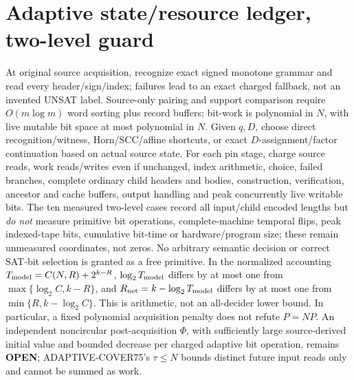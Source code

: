 \documentclass[10pt]{article}
\begin{document}
\section{Adaptive state/resource ledger, two-level guard}
At original source acquisition, recognize exact signed monotone grammar and read every header/sign/index; failures lead to an exact charged fallback, not an invented UNSAT label. Source-only pairing and support comparison require \(O(m\log m)\) word sorting plus record buffers; bit-work is polynomial in \(N\), with live mutable bit space at most polynomial in \(N\). Given \(q,D\), choose direct recognition/witness, Horn/SCC/affine shortcuts, or exact \(D\)-assignment/factor continuation based on actual source state. For each pin stage, charge source reads, work reads/writes even if unchanged, index arithmetic, choice, failed branches, complete ordinary child headers and bodies, construction, verification, ancestor and cache buffers, output handling and peak concurrently live writable bits. The ten measured two-level cases record all input/child encoded lengths but \emph{do not} measure primitive bit operations, complete-machine temporal flips, peak indexed-tape bits, cumulative bit-time or hardware/program size; these remain unmeasured coordinates, not zeros. No arbitrary semantic decision or correct SAT-bit selection is granted as a free primitive.
In the normalized accounting \(T_{\rm model}=C(N,R)+2^{k-R}\), \(\log_2T_{\rm model}\) differs by at most one from \(\max\{\log_2 C,k-R\}\), and \(R_{\rm net}=k-\log_2T_{\rm model}\) differs by at most one from \(\min\{R,k-\log_2C\}\). This is arithmetic, not an all-decider lower bound. In particular, a fixed polynomial acquisition penalty does not refute \(P=NP\). An independent noncircular post-acquisition \(\Phi\), with sufficiently large source-derived initial value and bounded decrease per charged adaptive bit operation, remains \textbf{OPEN}; ADAPTIVE-COVER75's \(\tau\le N\) bounds distinct future input reads only and cannot be summed as work.
\end{document}
